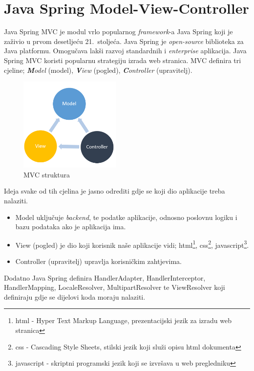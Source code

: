 \documentclass[times, utf8, zavrsni, numeric]{fer}
\begin{document}
\section{Java Spring Model-View-Controller}
\qquad Java Spring MVC je modul vrlo popularnog \textit{framework}-a\footnotemark{} Java Spring koji je zaživio u prvom desetljeću 21.~stoljeća.
Java Spring je \textit{open-source}\footnotemark{} biblioteka za Java platformu.
Omogučava lakši razvoj standardnih i \textit{enterprise}\footnotemark{} aplikacija.
Java Spring MVC koristi popularnu strategiju izrada web stranica.
MVC definira tri cjeline; \textit{\textbf{M}odel} (model), \textit{\textbf{V}iew} (pogled), \textit{\textbf{C}ontroller} (upravitelj).
\begin{figure}[htb]
				\centering
				\includegraphics[width=5cm]{images/mvc.png}
				\caption{MVC struktura}
				\label{fig:mvc}
\end{figure}

\noindent
Ideja svake od tih cjelina je jasno odrediti gdje se koji dio aplikacije treba nalaziti.
\begin{itemize}
				\item Model uključuje \textit{backend}\footnotemark{}, te podatke aplikacije, odnosno poslovnu logiku i bazu podataka ako je aplikacija ima.
	\item View (pogled) je dio koji korisnik naše aplikacije vidi; 
		html\footnote{html - Hyper Text Markup Language, prezentacijski jezik za izradu web stranica}, 
		css\footnote{css - Cascading Style Sheets, stilski jezik koji služi opisu html dokumenta}, 
		javascript\footnote{javascript - skriptni programski jezik koji se izvršava u web pregledniku}.
	\item Controller (upravitelj) upravlja korisničkim zahtjevima.
\end{itemize}
Dodatno Java Spring definira HandlerAdapter, HandlerInterceptor, HandlerMapping, LocaleResolver, MultipartResolver te ViewResolver koji definiraju gdje se dijelovi koda moraju nalaziti.
\end{document}

